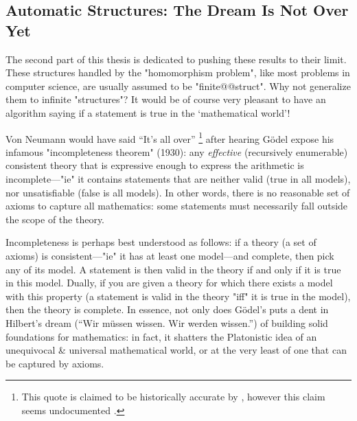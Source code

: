 \subsection{Automatic Structures: The Dream Is Not Over Yet}

The second part of this thesis is dedicated to pushing these results to their limit.
These structures handled by the "homomorphism problem", like most
problems in computer science, are usually assumed to be "finite@@struct".
Why not generalize them to infinite "structures"? It would be of course
very pleasant to have an algorithm saying if a statement is true
in the `mathematical world'!

Von Neumann would have said ``It's all over''%
\footnote{This quote is claimed to be historically accurate by
\cite{2009Logicomix}, however this claim seems undocumented \cite{Mancosu2011Logicomix}.}
after hearing Gödel expose his infamous "incompleteness theorem" (1930):
any \emph{effective} (recursively enumerable)
consistent theory that is expressive enough to express the arithmetic
is incomplete---"ie" it contains statements that are neither valid (true in all models),
nor unsatisfiable (false is all models).
In other words, there is no reasonable set of axioms
to capture all mathematics: some statements must necessarily fall outside
the scope of the theory.

Incompleteness is perhaps best understood as follows:
if a theory (a set of axioms) is consistent---"ie" it has at least one model---and complete, 
then pick any of its model. A statement is then valid in the theory if and only
if it is true in this model. Dually, if you are given a theory for which
there exists a model with this property (a statement is valid in the theory "iff" it
is true in the model), then the theory is complete.
In essence, not only does Gödel's puts a dent in Hilbert's dream
(``Wir müssen wissen. Wir werden wissen.'') of building solid foundations for mathematics:
in fact, it shatters the Platonistic idea of an unequivocal \& universal mathematical world, or 
at the very least of one that can be captured by axioms.

